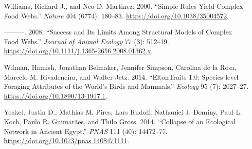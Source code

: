 \documentclass[
  letterpaper,
  DIV=11,
  numbers=noendperiod]{scrartcl}
\newlength{\cslhangindent}
\newenvironment{CSLReferences}[2] %
 {\begin{list}{}{%
  \setlength{\itemindent}{0pt}
  \setlength{\leftmargin}{0pt}
  \setlength{\parsep}{0pt}
  \ifodd #1
   \setlength{\leftmargin}{\cslhangindent}
   \setlength{\itemindent}{-1\cslhangindent}
  \fi
  \setlength{\itemsep}{#2\baselineskip}}}
 {\end{list}}
\begin{document}
\begin{CSLReferences}{1}{0}
Williams, Richard J., and Neo D. Martinez. 2000. {``Simple Rules Yield
Complex Food Webs.''} \emph{Nature} 404 (6774): 180--83.
\url{https://doi.org/10.1038/35004572}.

---------. 2008. {``Success and Its Limits Among Structural Models of
Complex Food Webs.''} \emph{Journal of Animal Ecology} 77 (3): 512--19.
\url{https://doi.org/10.1111/j.1365-2656.2008.01362.x}.

Wilman, Hamish, Jonathan Belmaker, Jennifer Simpson, Carolina de la
Rosa, Marcelo M. Rivadeneira, and Walter Jetz. 2014. {``{EltonTraits}
1.0: {Species-level} Foraging Attributes of the World's Birds and
Mammals.''} \emph{Ecology} 95 (7): 2027--27.
\url{https://doi.org/10.1890/13-1917.1}.

Yeakel, Justin D., Mathias M. Pires, Lars Rudolf, Nathaniel J. Dominy,
Paul L. Koch, Paulo R. Guimarães, and Thilo Gross. 2014. {``Collapse of
an Ecological Network in {Ancient Egypt}.''} \emph{PNAS} 111 (40):
14472--77. \url{https://doi.org/10.1073/pnas.1408471111}.

\end{CSLReferences}
\end{document}
